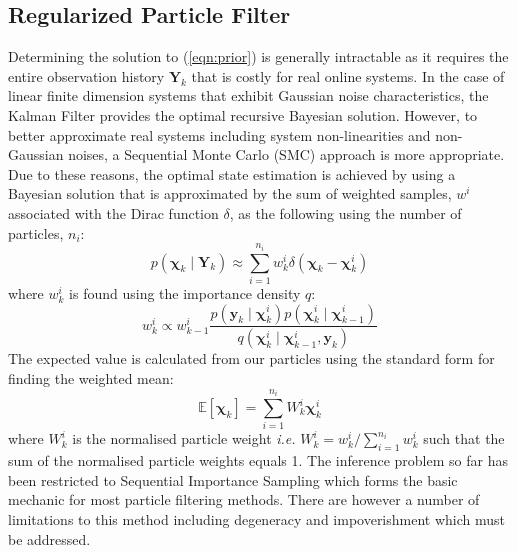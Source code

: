 \documentclass[onecolumn,journal,draftclsnofoot]{IEEEtran}
\newtheorem{remark}{Remark}
\begin{document}
\subsection{Regularized Particle Filter}
Determining the solution to (\ref{eqn:prior}) is generally intractable as it requires the entire observation history \(\mathbf{Y}_{k}\) that is costly for real online systems. In the case of linear finite dimension systems that exhibit Gaussian noise characteristics, the Kalman Filter provides the optimal recursive Bayesian solution.
However, to better approximate real systems including system non-linearities and non-Gaussian noises, a Sequential Monte Carlo (SMC) approach is more appropriate.
Due to these reasons,  the optimal state estimation is achieved by using a Bayesian solution \cite{Branko2004} that is approximated by the sum of weighted samples, \(w^i\) associated with the Dirac function \(\delta\), as the following using the number of particles, \(n_i\):
\begin{equation}
    p\left(\mathbf{\chi}_{k} \mid \mathbf{Y}_k\right) \approx \sum_{i=1}^{n_i} w_{k}^{i} \delta\left(\mathbf{\chi}_{k}-\mathbf{\chi}_{k}^{i}\right)
\end{equation}
where \(w_k^i\) is found using the importance density \(q\):
\begin{equation} \label{eqn:likeli}
    w_k^i \propto w_{k-1}^i \frac{p\left(\mathbf{y}_k \mid \mathbf{\chi}_k^i\right) p\left(\mathbf{\chi}_k^i \mid \mathbf{\chi}_{k-1}^i \right)}{q\left(\mathbf{\chi}_k^i \mid \mathbf{\chi}_{k-1}^i,\mathbf{y}_k \right)}
\end{equation}
The expected value is calculated from our particles using the standard form for finding the weighted mean:
\begin{equation}\label{eqn:exp}
    \mathbb{E} \left[\mathbf{\chi}_k\right] = \sum_{i=1}^{n_i} W_k^i \mathbf{\chi}_k^i
\end{equation}
where \(W^i_k\) is the normalised particle weight \emph{i.e.} \(W^i_k = w^i_k / \sum_{i=1}^{n_i}w^i_k\) such that the sum of the normalised particle weights equals 1.
The inference problem so far has been restricted to Sequential Importance Sampling which forms the basic mechanic for most particle filtering methods.
There are however a number of limitations to this method including degeneracy and impoverishment which must be addressed. 
\end{document}
